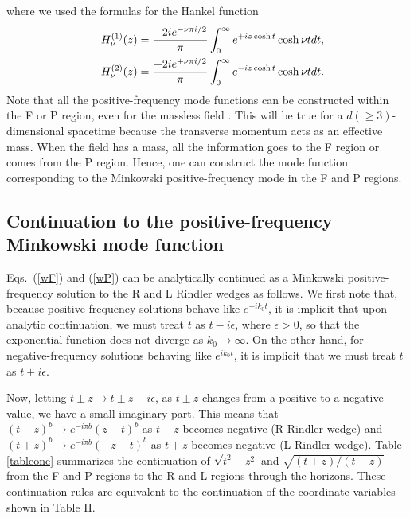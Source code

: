 \documentclass[aps,prd,preprintnumbers,nofootinbib,showpacs,11pt]{revtex4}%
\begin{document}
\begin{widetext}
where we used
the formulas for the Hankel function
\begin{eqnarray}
&&H^{(1)}_\nu(z)={-2ie^{-\nu\pi i/2}\over \pi}\int_0^\infty e^{+iz\cosh t}\cosh \nu t dt,
\\
&&H^{(2)}_\nu(z)={+2ie^{+\nu\pi i/2}\over \pi}\int_0^\infty e^{-iz\cosh t}\cosh \nu t dt.
\end{eqnarray}
Note that all the positive-frequency mode functions can be constructed within the F or P region,
even for the massless field \cite{Higuchi,Fulling,BD,Padmanabhan}. 
This will be true for a $d(\geq 3)$-dimensional
spacetime because the transverse momentum acts as an effective mass. 
When the field has a mass, all the information goes to the F region or comes from the P region.
Hence, one can construct the mode function corresponding to the Minkowski positive-frequency mode
in the F and P regions.


\subsection{Continuation to the positive-frequency Minkowski mode function}
Eqs.~(\ref{wF}) and (\ref{wP}) can be analytically continued as a 
Minkowski positive-frequency solution to the R and
L Rindler wedges as follows. We first note that, because positive-frequency solutions behave 
like $e^{-ik_0 t}$, it is implicit that upon analytic continuation,
we must treat $t$ as $t-i\epsilon$, where $\epsilon > 0$, so that the exponential function does 
not diverge as $k_0\to\infty$. On the other hand, for negative-frequency solutions behaving 
like $e^{ik_0 t}$, it is implicit that we must treat $t$ as $t+i\epsilon$.

Now, letting $t\pm z \to t \pm z -i\epsilon$, as $t\pm z$ changes from a positive to a negative value, 
we have a small imaginary part. This means that
$(t - z)^b \to e^{-i\pi b}(z-t)^b$ as $t-z$ becomes negative (R Rindler wedge) and
$(t+z)^b \to e^{-i\pi b}(-z-t)^b$ as $t+z$ becomes negative (L Rindler wedge).  
Table \ref{tableone} summarizes the continuation of $\sqrt{t^2-z^2}$ and 
$\sqrt{(t+z)/(t-z)}$ from the F and P regions to the R and L regions through the horizons.
These continuation rules are equivalent to the continuation of the coordinate variables 
shown in Table II.


\end{widetext}
\end{document}
